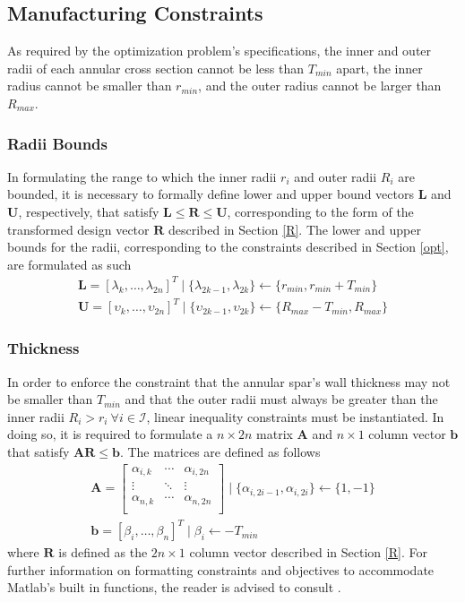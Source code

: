 \documentclass{article}
\begin{document}
\subsection{Manufacturing Constraints}
As required by the optimization problem's specifications, the inner and outer radii of each annular cross section cannot be less than $T_{min}$ apart, the inner radius cannot be smaller than $r_{min}$, and the outer radius cannot be larger than $R_{max}$.

\subsubsection{Radii Bounds}
In formulating the range to which the inner radii $r_i$ and outer radii $R_i$ are bounded, it is necessary to formally define lower and upper bound vectors $\mathbf{L}$ and $\mathbf{U}$, respectively, that satisfy $\mathbf{L} \leq \mathbf{R} \leq \mathbf{U}$, corresponding to the form of the transformed design vector $\mathbf{R}$ described in Section \ref{R}. The lower and upper bounds for the radii, corresponding to the constraints described in Section \ref{opt}, are formulated as such
$$
\begin{gathered}
\mathbf{L} = [\lambda_k, \dots, \lambda_{2n}]^T \mid \{ \lambda_{2k-1}, \lambda_{2k} \} \leftarrow \{ r_{min}, r_{min} + T_{min} \} \\
\mathbf{U} = [\upsilon_k, \dots, \upsilon_{2n}]^T \mid \{ \upsilon_{2k-1}, \upsilon_{2k} \} \leftarrow \{ R_{max} - T_{min}, R_{max} \}
\end{gathered}
$$

\subsubsection{Thickness}
In order to enforce the constraint that the annular spar's wall thickness may not be smaller than $T_{min}$ and that the outer radii must always be greater than the inner radii $R_i > r_i ~ \forall i \in \mathcal{I}$, linear inequality constraints must be instantiated. In doing so, it is required to formulate a $n \times 2n$ matrix $\mathbf{A}$ and $n \times 1$ column vector $\mathbf{b}$ that satisfy $\mathbf{A}\mathbf{R} \leq \mathbf{b}$. The matrices are defined as follows
$$
\begin{gathered}
\mathbf{A} = 
 \begin{bmatrix}
  \alpha_{i,k} & \cdots & \alpha_{i,2n} \\
  \vdots  & \ddots & \vdots  \\
  \alpha_{n,k} & \cdots & \alpha_{n,2n} \\
 \end{bmatrix}
 \mid \{ \alpha_{i,2i-1}, \alpha_{i,2i} \} \leftarrow \{1,-1 \} \\
 \mathbf{b} = [\beta_i, \dots, \beta_n]^T \mid \beta_i \leftarrow -T_{min}
\end{gathered}
$$
where $\mathbf{R}$ is defined as the $2n \times 1$ column vector described in Section \ref{R}. For further information on formatting constraints and objectives to accommodate Matlab's built in functions, the reader is advised to consult \cite{Attaway2013}.
\end{document}
